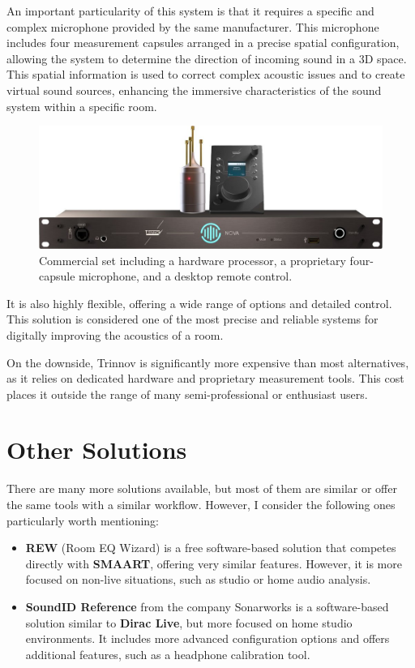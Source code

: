 An important particularity of this system is that it requires a specific and complex microphone provided by the same manufacturer. This microphone includes four measurement capsules arranged in a precise spatial configuration, allowing the system to determine the direction of incoming sound in a 3D space. This spatial information is used to correct complex acoustic issues and to create virtual sound sources, enhancing the immersive characteristics of the sound system within a specific room.

\begin{figure}[H]
	\centering
	\includegraphics[width=0.9
	\linewidth]{Figures/trinnov_set.jpg}
	\caption{Commercial set including a hardware processor, a proprietary four-capsule microphone, and a desktop remote control.}
	\label{fig:trinnov_hard}
\end{figure}

It is also highly flexible, offering a wide range of options and detailed control. This solution is considered one of the most precise and reliable systems for digitally improving the acoustics of a room.

On the downside, Trinnov is significantly more expensive than most alternatives, as it relies on dedicated hardware and proprietary measurement tools. This cost places it outside the range of many semi-professional or enthusiast users.


\section{Other Solutions}

There are many more solutions available, but most of them are similar or offer the same tools with a similar workflow. However, I consider the following ones particularly worth mentioning:

\begin{itemize}
	\item \textbf{REW} (Room EQ Wizard)\cite{rew} is a free software-based solution that competes directly with \textbf{SMAART}, offering very similar features. However, it is more focused on non-live situations, such as studio or home audio analysis.

	\item \textbf{SoundID Reference} from the company Sonarworks \cite{soundID} is a software-based solution similar to \textbf{Dirac Live}, but more focused on home studio environments. It includes more advanced configuration options and offers additional features, such as a headphone calibration tool.
	
\end{itemize}


